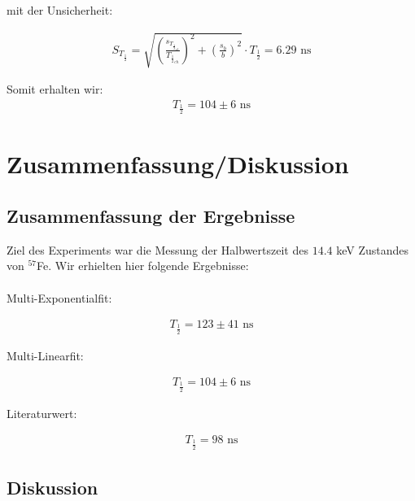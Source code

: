 \documentclass[12pt]{article}
\begin{document}
mit der Unsicherheit:

\begin{align*}
S_{T_{\frac12}} = \sqrt{\left(\frac{s_{T_{{\frac12}_{ch}}}}{T_{{\frac12}_{ch}}}\right)^2+\left(\frac{s_b}{b}\right)^2} \cdot T_{\frac12} = 6.29 \text{ ns}
\end{align*}

Somit erhalten wir:
\begin{align*}
T_{\frac12} = 104 \pm 6 \text{ ns}
\end{align*}

\newpage
\section{Zusammenfassung/Diskussion}

\subsection{Zusammenfassung der Ergebnisse}

Ziel des Experiments war die Messung der Halbwertszeit des $14.4$ keV Zustandes von $^{57}$Fe. Wir erhielten hier folgende Ergebnisse:\\
\\
Multi-Exponentialfit: 

\begin{align*}
T_{\frac12} = 123 \pm 41 \text{ ns}
\end{align*}

Multi-Linearfit:

\begin{align*}
T_{\frac12} = 104 \pm 6 \text{ ns}
\end{align*}

Literaturwert: \cite{anleitung}

\begin{align*}
T_{\frac12} = 98 \text{ ns}
\end{align*}


\subsection{Diskussion}\label{Diskussion}
\end{document}
